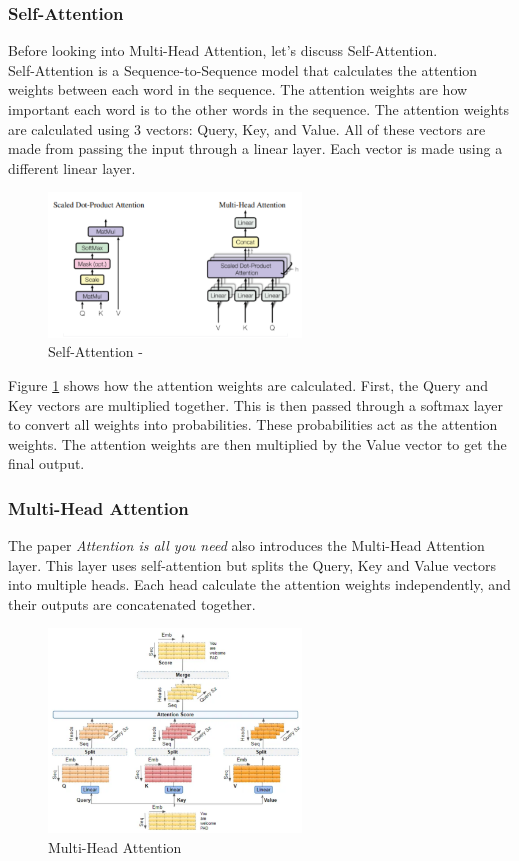 \subsubsection{Self-Attention}
Before looking into Multi-Head Attention, let's discuss Self-Attention.\\
Self-Attention is a Sequence-to-Sequence model that calculates the attention weights between each word in the sequence. The attention
weights are how important each word is to the other words in the sequence. The attention weights are calculated using 3 vectors:
Query, Key, and Value. All of these vectors are made from passing the input through a linear layer. Each vector is made using a different
linear layer.
\begin{figure}
    \centering
    \includegraphics[width=0.6\textwidth]{../images/attention.png}
    \caption{Self-Attention - \cite{attention}}
    \label{fig:self-attention}
\end{figure} 

Figure \ref{fig:self-attention} shows how the attention weights are calculated. First, the Query and Key vectors are multiplied together.
This is then passed through a softmax layer to convert all weights into probabilities. These probabilities act as the attention weights.
The attention weights are then multiplied by the Value vector to get the final output.
\subsubsection{Multi-Head Attention}
The paper \textit{Attention is all you need} \cite{Attention} also introduces the Multi-Head Attention layer. This layer uses self-attention
but splits the Query, Key and Value vectors into multiple heads. Each head calculate the attention weights independently, and their outputs
are concatenated together.
\begin{figure}
    \centering
    \includegraphics[width=0.6\textwidth]{../images/multi-head-attention.png}
    \caption{Multi-Head Attention}
    \label{fig:multi-head-attention}
\end{figure}

